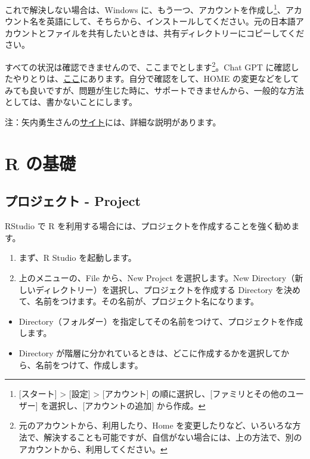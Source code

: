 \documentclass[
  xelatex, ja=standard]{bxjsbook}
\providecommand{\tightlist}{%
  \setlength{\itemsep}{0pt}\setlength{\parskip}{0pt}}
\theoremstyle{definition}
\theoremstyle{definition}
\theoremstyle{definition}
\theoremstyle{definition}
\theoremstyle{remark}
\begin{document}
これで解決しない場合は、Windows に、もう一つ、アカウントを作成し\footnote{{[}スタート{]} \textgreater{} {[}設定{]} \textgreater{} {[}アカウント{]} の順に選択し、{[}ファミリとその他のユーザー{]} を選択し、{[}アカウントの追加{]} から作成。}、アカウント名を英語にして、そちらから、インストールしてください。元の日本語アカウントとファイルを共有したいときは、共有ディレクトリーにコピーしてください。

すべての状況は確認できませんので、ここまでとします\footnote{元のアカウントから、利用したり、Home を変更したりなど、いろいろな方法で、解決することも可能ですが、自信がない場合には、上の方法で、別のアカウントから、利用してください。}。Chat GPT に確認したやりとりは、\href{https://icu-hsuzuki.github.io/ds_education/chatgpt.html\#chatgpt}{ここ}にあります。自分で確認をして、HOME の変更などをしてみても良いですが、問題が生じた時に、サポートできませんから、一般的な方法としては、書かないことにします。

注：矢内勇生さんの\href{https://yukiyanai.github.io/jp/resources/docs/install-R_windows.pdf}{サイト}には、詳細な説明があります。

\hypertarget{rbasics}{%
\chapter{R の基礎}\label{rbasics}}

\hypertarget{ux30d7ux30edux30b8ux30a7ux30afux30c8---project}{%
\section{プロジェクト - Project}\label{ux30d7ux30edux30b8ux30a7ux30afux30c8---project}}

RStudio で R を利用する場合には、プロジェクトを作成することを強く勧めます。

\begin{enumerate}
\def\labelenumi{\arabic{enumi}.}
\item
  まず、R Studio を起動します。
\item
  上のメニューの、File から、New Project を選択します。New Directory（新しいディレクトリー）を選択し、プロジェクトを作成する Directory を決めて、名前をつけます。その名前が、プロジェクト名になります。
\end{enumerate}

\begin{itemize}
\tightlist
\item
  Directory（フォルダー）を指定してその名前をつけて、プロジェクトを作成します。
\item
  Directory が階層に分かれているときは、どこに作成するかを選択してから、名前をつけて、作成します。
\end{itemize}
\end{document}
